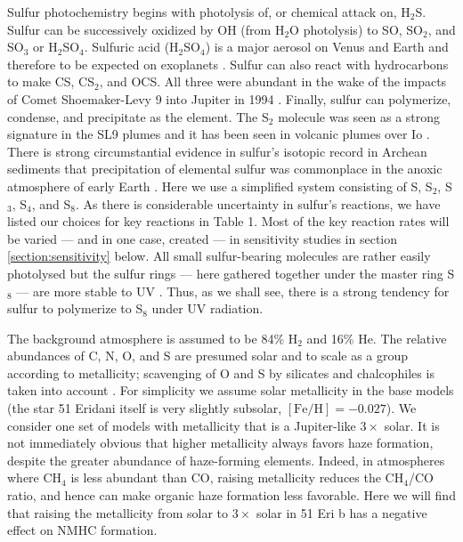 \documentclass[preprint]{aastex6}
\newcounter{reaction}
\begin{document}
Sulfur photochemistry begins with photolysis of, or chemical attack on, H$_2$S.
Sulfur can be successively oxidized by OH (from H$_2$O photolysis) to SO, SO$_2$, and SO$_3$ or H$_2$SO$_4$.
Sulfuric acid (H$_2$SO$_4$) is a major aerosol on Venus and
Earth {\color{red} and therefore to be expected on exoplanets \citep{Hu2013}}.  
Sulfur can also react with hydrocarbons to make CS, CS$_2$, and OCS.  All three were abundant in the wake
of the impacts of Comet Shoemaker-Levy 9 into Jupiter in 1994 \citep{Harrington2004}. 
Finally, sulfur can polymerize, condense, and precipitate as the element.
The S$_2$ molecule was seen as a strong signature in the SL9 plumes \citep{Moses1995,Zahnle1995}
and it has been seen in volcanic plumes over Io \citep{Spencer2000}. 
There is strong circumstantial evidence in sulfur's isotopic record in Archean sediments that precipitation of elemental sulfur
was commonplace in the anoxic atmosphere of early Earth \citep{Pavlov2002}.
Here we use a simplified system consisting of S, S$_2$, S$_3$, S$_4$, and S$_8$.
As there is considerable uncertainty in sulfur's reactions, we have listed our choices for key reactions in Table 1.
Most of the key reaction rates will be varied --- and in one case, created --- in sensitivity studies in section \ref{section:sensitivity} below.
All small sulfur-bearing molecules are rather easily photolysed but the sulfur rings
--- here gathered together under the master ring S$_8$ --- are
more stable to UV \citep{Young1983,Kasting1989,Yung2009}.
Thus, as we shall see, there is a strong tendency for sulfur to polymerize to S$_8$ under UV radiation. 


The background atmosphere is assumed to be 84\% H$_2$ and 16\% He.
The relative abundances of C, N, O, and S are presumed solar and to scale as a group according to metallicity;
scavenging of O and S by silicates and chalcophiles is taken into account \citep{Lodders2006}.
For simplicity we assume solar metallicity in the base models
(the star 51 Eridani itself is very slightly subsolar, $\left[\mathrm{Fe}/\mathrm{H}\right]=-0.027$).
We consider one set of models with metallicity that is a Jupiter-like $3\times$ solar. 
It is not immediately obvious that higher metallicity always favors haze formation,
despite the greater abundance of haze-forming elements. 
Indeed, in atmospheres where CH$_4$ is less abundant than CO, raising metallicity reduces the CH$_4$/CO
ratio, and hence can make organic haze formation less favorable.
Here we will find that raising the metallicity from solar to $3\times$ solar in 51 Eri b 
has a negative effect on NMHC formation.
\end{document}
